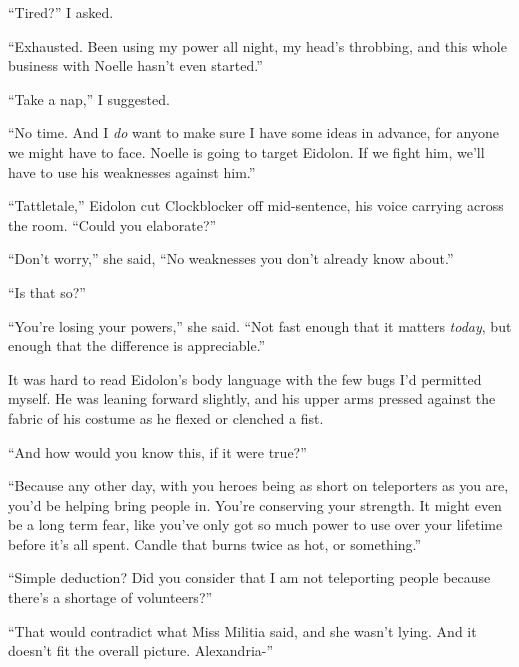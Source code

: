 ``Tired?'' I asked.



``Exhausted.  Been using my power all night, my head's throbbing, and this whole business with Noelle hasn't even started.''



``Take a nap,'' I suggested.



``No time.  And I \emph{do} want to make sure I have some ideas in advance, for anyone we might have to face.  Noelle is going to target Eidolon.  If we fight him, we'll have to use his weaknesses against him.''



``Tattletale,'' Eidolon cut Clockblocker off mid-sentence, his voice carrying across the room.  ``Could you elaborate?''



``Don't worry,'' she said, ``No weaknesses you don't already know about.''



``Is that so?''



``You're losing your powers,'' she said.  ``Not fast enough that it matters \emph{today}, but enough that the difference is appreciable.''



It was hard to read Eidolon's body language with the few bugs I'd permitted myself.  He was leaning forward slightly, and his upper arms pressed against the fabric of his costume as he flexed or clenched a fist.



``And how would you know this, if it were true?''



``Because any other day, with you heroes being as short on teleporters as you are, you'd be helping bring people in.  You're conserving your strength.  It might even be a long term fear, like you've only got so much power to use over your lifetime before it's all spent.  Candle that burns twice as hot, or something.''



``Simple deduction?  Did you consider that I am not teleporting people because there's a shortage of volunteers?''



``That would contradict what Miss Militia said, and she wasn't lying.  And it doesn't fit the overall picture.  Alexandria-''



